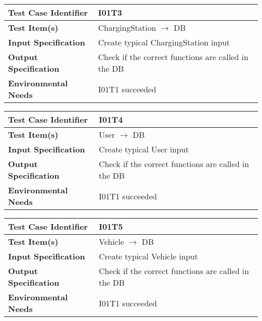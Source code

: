 \begin{center}
	\vspace{0.6cm}
	\begin{tabular}{|l|l|}
		\hline
		\textbf{Test Case Identifier} & I01T3 \bigstrut \\\hline
		\textbf{Test Item(s)} & ChargingStation \ensuremath{\rightarrow} DB \bigstrut \\\hline
		\textbf{Input Specification} & Create typical ChargingStation input \bigstrut \\\hline
		\textbf{Output Specification} & Check if the correct functions are called in the DB \bigstrut \\\hline
		\textbf{Environmental Needs} & I01T1 succeeded\bigstrut \\\hline
	\end{tabular}
\end{center}

\begin{center}
	\vspace{0.6cm}
	\begin{tabular}{|l|l|}
		\hline
		\textbf{Test Case Identifier} & I01T4 \bigstrut \\\hline
		\textbf{Test Item(s)} & User \ensuremath{\rightarrow} DB \bigstrut \\\hline
		\textbf{Input Specification} & Create typical User input \bigstrut \\\hline
		\textbf{Output Specification} & Check if the correct functions are called in the DB \bigstrut \\\hline
		\textbf{Environmental Needs} & I01T1 succeeded\bigstrut \\\hline
	\end{tabular}
\end{center}

\begin{center}
	\vspace{0.6cm}
	\begin{tabular}{|l|l|}
		\hline
		\textbf{Test Case Identifier} & I01T5 \bigstrut \\\hline
		\textbf{Test Item(s)} & Vehicle \ensuremath{\rightarrow} DB \bigstrut \\\hline
		\textbf{Input Specification} & Create typical Vehicle input \bigstrut \\\hline
		\textbf{Output Specification} & Check if the correct functions are called in the DB \bigstrut \\\hline
		\textbf{Environmental Needs} & I01T1 succeeded\bigstrut \\\hline
	\end{tabular}
\end{center}

